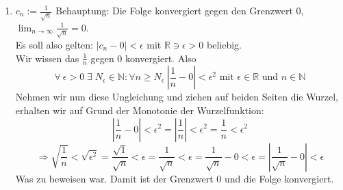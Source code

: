 \documentclass[11pt]{article}
\begin{document}
\begin{enumerate}[ label= (\roman*) ]
        \item \(c_n := \frac{1}{\sqrt{n}} \)
        Behauptung: Die Folge konvergiert gegen den Grenzwert 0, \(\lim_{n \to \infty } \frac{1}{\sqrt{n}} = 0 \). \\
        Es soll also gelten: \( |c_n - 0| < \epsilon \) mit \( \mathbb{R} \ni \epsilon > 0\) beliebig. \\
        Wir wissen das \(\frac{1}{n}\) gegen 0 konvergiert. Also
        \[\forall \: \epsilon > 0 \; \exists \; N_{\epsilon} \in \mathbb{N} : \forall n \geq N_{\epsilon} \: |\frac{1}{n} - 0| < \epsilon^2
        \text{ mit } \epsilon \in \mathbb{R} \text{ und } n \in \mathbb{N}\]
        Nehmen wir nun diese Ungleichung und ziehen auf beiden Seiten die Wurzel, erhalten wir auf Grund der Monotonie der Wurzelfunktion:
        \[
            |\frac{1}{n} - 0| < \epsilon^2
            = |\frac{1}{n}| < \epsilon^2
            = \frac{1}{n} < \epsilon^2
        \]
        \[
            \Rightarrow \sqrt{ \frac{1}{n} }  < \sqrt{ \epsilon^2 }
            = \frac{ \sqrt{1} }{ \sqrt{n} }  < \epsilon
            = \frac{ 1 }{ \sqrt{n} }  < \epsilon
            = \frac{ 1 }{ \sqrt{n} } - 0 < \epsilon
            = | \frac{ 1 }{ \sqrt{n} } - 0 | < \epsilon
        \]
        Was zu beweisen war. Damit ist der Grenzwert 0 und die Folge konvergiert.


    \end{enumerate}
    
    
\end{document}
